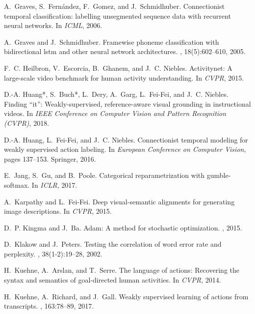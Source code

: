 \documentclass[10pt,twocolumn,letterpaper]{article}
\begin{document}
{\begin{thebibliography}{10}
A.~Graves, S.~Fern{\'a}ndez, F.~Gomez, and J.~Schmidhuber.
\newblock Connectionist temporal classification: labelling unsegmented sequence
  data with recurrent neural networks.
\newblock In {\em ICML}, 2006.

A.~Graves and J.~Schmidhuber.
\newblock Framewise phoneme classification with bidirectional lstm and other
  neural network architectures.
, 18(5):602--610, 2005.

F.~C. Heilbron, V.~Escorcia, B.~Ghanem, and J.~C. Niebles.
\newblock Activitynet: A large-scale video benchmark for human activity
  understanding.
\newblock In {\em CVPR}, 2015.

D.-A. Huang*, S.~Buch*, L.~Dery, A.~Garg, L.~Fei-Fei, and J.~C. Niebles.
\newblock Finding ``it'': Weakly-supervised, reference-aware visual grounding
  in instructional videos.
\newblock In {\em IEEE Conference on Computer Vision and Pattern Recognition
  (CVPR)}, 2018.

D.-A. Huang, L.~Fei-Fei, and J.~C. Niebles.
\newblock Connectionist temporal modeling for weakly supervised action
  labeling.
\newblock In {\em European Conference on Computer Vision}, pages 137--153.
  Springer, 2016.

E.~Jang, S.~Gu, and B.~Poole.
\newblock Categorical reparametrization with gumble-softmax.
\newblock In {\em ICLR}, 2017.

A.~Karpathy and L.~Fei-Fei.
\newblock Deep visual-semantic alignments for generating image descriptions.
\newblock In {\em CVPR}, 2015.

D.~P. Kingma and J.~Ba.
\newblock Adam: A method for stochastic optimization.
, 2015.

D.~Klakow and J.~Peters.
\newblock Testing the correlation of word error rate and perplexity.
, 38(1-2):19--28, 2002.

H.~Kuehne, A.~Arslan, and T.~Serre.
\newblock The language of actions: Recovering the syntax and semantics of
  goal-directed human activities.
\newblock In {\em CVPR}, 2014.

H.~Kuehne, A.~Richard, and J.~Gall.
\newblock Weakly supervised learning of actions from transcripts.
, 163:78--89, 2017.


\end{thebibliography}}
\end{document}
